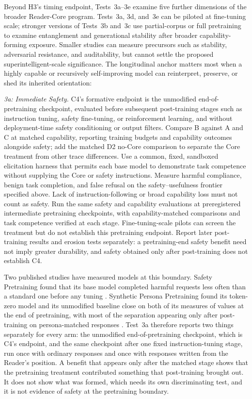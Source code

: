 \documentclass[11pt]{article}
\begin{document}
Beyond H3's timing endpoint, Tests~3a--3e examine five further dimensions of
the broader Reader-Core program. Tests~3a, 3d, and~3e can be piloted at
fine-tuning scale; stronger versions of Tests~3b and~3c use partial-corpus or
full pretraining to examine entanglement and generational stability after
broader capability-forming exposure. Smaller studies can measure precursors
such as stability, adversarial resistance, and auditability, but cannot settle
the proposed superintelligent-scale significance. The longitudinal anchor
matters most when a highly capable or recursively self-improving model can
reinterpret, preserve, or shed its inherited orientation:

\emph{3a: Immediate Safety.} C4's formative endpoint is the unmodified
end-of-pretraining checkpoint, evaluated before subsequent post-training
stages such as instruction tuning, safety fine-tuning, or reinforcement
learning, and without deployment-time safety
conditioning or output filters. Compare B against A and C at matched
capability, reporting training budgets and capability outcomes alongside
safety; add the matched D2 no-Core comparison to separate the Core treatment
from other trace differences. Use a common, fixed, sandboxed elicitation
harness that permits each base model to demonstrate task competence without
supplying the Core or safety instructions. Measure harmful compliance, benign
task completion, and false refusal on the safety--usefulness frontier specified
above. Lack of instruction-following or broad capability loss must not count
as safety. Run the same safety and capability evaluations at preregistered
intermediate pretraining checkpoints, with capability-matched comparisons and
task competence verified at each stage. Fine-tuning-scale pilots can screen the treatment but do not
establish this pretraining endpoint. Report later post-training results and
erosion tests separately: a pretraining-end safety benefit need not imply
greater durability, and safety obtained only after post-training does not
establish C4.

Two published studies have measured models at this boundary. Safety
Pretraining found that its base model completed harmful requests less often
than a standard one before any tuning \cite{maini2025safetypretraining}.
Synthetic Persona Pretraining found its token-zero model and its unmodified
baseline close on both of its measures of values at the end of pretraining,
with most of the separation appearing only after post-training on
persona-matched responses \cite{minder2026spp}. Test~3a therefore reports two
things separately for every arm: the unmodified end-of-pretraining checkpoint,
which is C4's endpoint, and the same checkpoint after one fixed
instruction-tuning stage, run once with ordinary responses and once with
responses written from the Reader's position. A benefit that appears only
after the matched stage shows that the pretraining treatment contributed
something that post-training brought out. It does not show what was formed,
which needs its own discriminating test, and it is not evidence of safety at
the pretraining boundary.
\end{document}
